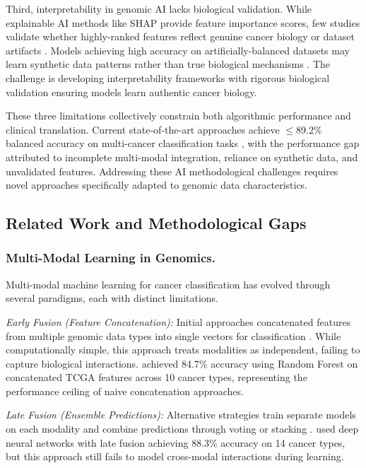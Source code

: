 \documentclass[manuscript, screen, review]{jair}
\begin{document}
Third, interpretability in genomic AI lacks biological validation. While explainable AI methods like SHAP provide feature importance scores, few studies validate whether highly-ranked features reflect genuine cancer biology or dataset artifacts \citep{lipton2018mythos,murdoch2019definitions}. Models achieving high accuracy on artificially-balanced datasets may learn synthetic data patterns rather than true biological mechanisms \citep{rudin2019stop}. The challenge is developing interpretability frameworks with rigorous biological validation ensuring models learn authentic cancer biology.

These three limitations collectively constrain both algorithmic performance and clinical translation. Current state-of-the-art approaches achieve $\leq$89.2\% balanced accuracy on multi-cancer classification tasks \citep{chen2022pancancer}, with the performance gap attributed to incomplete multi-modal integration, reliance on synthetic data, and unvalidated features. Addressing these AI methodological challenges requires novel approaches specifically adapted to genomic data characteristics.

\subsection{Related Work and Methodological Gaps}

\subsubsection{Multi-Modal Learning in Genomics.}

Multi-modal machine learning for cancer classification has evolved through several paradigms, each with distinct limitations.

\emph{Early Fusion (Feature Concatenation):} Initial approaches concatenated features from multiple genomic data types into single vectors for classification \citep{subramanian2020multiomics,rappoport2018multiomic}. While computationally simple, this approach treats modalities as independent, failing to capture biological interactions. \citet{li2017comprehensive} achieved 84.7\% accuracy using Random Forest on concatenated TCGA features across 10 cancer types, representing the performance ceiling of naive concatenation approaches.

\emph{Late Fusion (Ensemble Predictions):} Alternative strategies train separate models on each modality and combine predictions through voting or stacking \citep{gao2020survey,stahlschmidt2022multimodal}. \citet{mostavi2020convolutional} used deep neural networks with late fusion achieving 88.3\% accuracy on 14 cancer types, but this approach still fails to model cross-modal interactions during learning.
\end{document}
